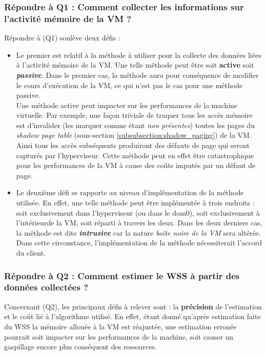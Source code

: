 \subsubsection{Répondre à Q1 : Comment collecter les informations sur l'activité mémoire de la VM ?}
Répondre à (Q1) soulève deux défis :
\begin{itemize}
    \item Le premier est relatif à la méthode à utiliser pour la collecte des données liées à l'activité mémoire de la VM. Une telle méthode peut être soit \textbf{active} soit \textbf{\textit{passive}}. Dans le premier cas, la méthode aura pour conséquence de modifier le cours d'exécution de la VM, ce qui n'est pas le cas pour une méthode passive.\\
    Une méthode active peut impacter sur les performances de la machine virtuelle. Par exemple, une façon triviale de traquer tous les accès mémoire est d'invalider (les marquer comme étant \textit{non présentes}) toutes les pages du \textit{shadow page table} (sous-section \ref{subsubsection:shadow_paging}) de la VM. Ainsi tous les accès subséquents produiront des défauts de page qui seront capturés par l'hyperviseur. Cette méthode peut en effet être catastrophique pour les performances de la VM à cause des coûts imputés par un défaut de page.
    
    \item Le deuxième défi se rapporte au niveau d'implémentation de la méthode utilisée. En effet, une telle méthode peut être implémentée à trois endroits : soit exclusivement dans l'hyperviseur (ou dans le dom0), soit exclusivement à l'intérieurde la VM, soit réparti à travers les deux. Dans les deux derniers cas, la méthode est dite \textbf{\textit{intrusive}} car la nature \textit{boîte noire de la VM} sera altérée. Dans cette circonstance, l'implémentation de la méthode nécessiterait l'accord du client.
\end{itemize}

\subsubsection{Répondre à Q2 : Comment estimer le WSS à partir des données collectées ?}
Concernant (Q2), les principaux défis à relever sont : la \textbf{précision} de l'estimation et le coût lié à l'algorithme utilisé. En effet, étant donné qu'après estimation faite du WSS la mémoire allouée à la VM est réajustée, une estimation erronée pourrait soit impacter sur les performances de la machine, soit causer un gaspillage encore plus conséquent des ressources.


